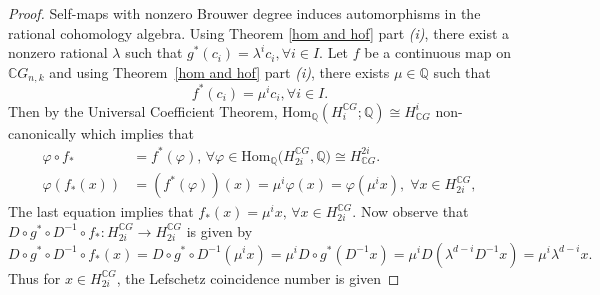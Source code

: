 \documentclass{amsart}
\newcommand{\thmref}[1]{Theorem~\ref{#1}}
\renewcommand{\hom}{\mathrm{Hom}}
\begin{document}
	
	\begin{proof}
	Self-maps with nonzero Brouwer degree induces automorphisms in the rational cohomology algebra. Using Theorem \ref{hom and hof} %
part \textit{(i)}, there %
exist a nonzero rational $\lambda$ such that $g^*(c_i)=\lambda^ic_i, \forall i\in I.$ Let $f$ be a continuous map on $\mathbb CG_{n,k}$ and using \thmref{hom and hof} %
part \textit{(i)}, there %
exists $\mu \in \mathbb Q$ such that
		\[
		f^*(c_i)=\mu^ic_i, \forall i\in I.
		\]
		Then by the Universal Coefficient Theorem, $ \hom_{\mathbb{Q}} (H_i^{\mathbb CG};\mathbb Q) \cong H^i_{\mathbb CG}$ non-canonically which implies %
that 
		\begin{align*}
			\varphi \circ f_* &= f^*(\varphi) , \, \forall
			\varphi \in \hom _{\mathbb Q}\big(H_{2i}^{\mathbb CG}, \mathbb Q\big)\cong H^{2i}_{\mathbb CG}.\\
			\varphi(f_*(x))&=(f^*(\varphi))(x)= \mu^i\varphi(x)=\varphi(\mu^ix),\; \forall x\in H_{2i}^{\mathbb CG},
		\end{align*}
		The %
last equation implies that $f_*(x)=\mu^ix,\, \forall x\in  H_{2i}^{\mathbb CG}.$
		Now observe that $D\circ g^*\circ D^{-1}\circ f_*: H_{2i}^{\mathbb CG}\to H_{2i}^{\mathbb CG}$ is given %
by 
		\[
		D\circ g^*\circ D^{-1}\circ f_*(x)=D\circ g^*\circ D^{-1}(\mu^ix)=\mu^iD\circ g^*(D^{-1}x)=\mu^iD(\lambda^{d-i}D^{-1}x)=\mu^i\lambda^{d-i}x.
		\]
		Thus %
for $x\in H_{2i}^{\mathbb{C}G}$, the Lefschetz coincidence number is given %

\end{proof}
\end{document}
